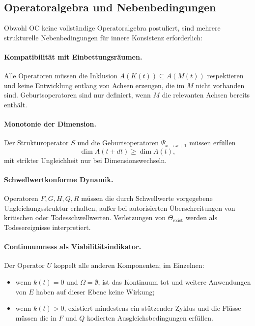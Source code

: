 \subsection{Operatoralgebra und Nebenbedingungen}

Obwohl OC keine vollständige Operatoralgebra postuliert, sind mehrere
strukturelle Nebenbedingungen für innere Konsistenz erforderlich:

\paragraph{Kompatibilität mit Einbettungsräumen.}
Alle Operatoren müssen die Inklusion
\(A(K(t)) \subseteq A(M(t))\) respektieren und keine Entwicklung entlang von
Achsen erzeugen, die im \(M\) nicht vorhanden sind. Geburtsoperatoren sind nur
definiert, wenn \(M\) die relevanten Achsen bereits enthält.

\paragraph{Monotonie der Dimension.}
Der Strukturoperator \(S\) und die Geburtsoperatoren \(\Psi_{x\to x+1}\) müssen
erfüllen
\[
  \dim A(t+dt) \ge \dim A(t),
\]
mit strikter Ungleichheit nur bei Dimensionswechseln.

\paragraph{Schwellwertkonforme Dynamik.}
Operatoren \(F, G, H, Q, R\) müssen die durch Schwellwerte vorgegebene
Ungleichungsstruktur erhalten, außer bei autorisierten Überschreitungen von
kritischen oder Todesschwellwerten. Verletzungen von
\(\Theta_{\mathrm{exist}}\) werden als Todesereignisse interpretiert.

\paragraph{Continuumness als Viabilitätsindikator.}
Der Operator \(U\) koppelt alle anderen Komponenten; im Einzelnen:
\begin{itemize}
  \item wenn \(k(t) = 0\) und \(\Omega = \emptyset\), ist das Kontinuum tot und
        weitere Anwendungen von \(E\) haben auf dieser Ebene keine Wirkung;
  \item wenn \(k(t) > 0\), existiert mindestens ein stützender Zyklus und die
        Flüsse müssen die in \(F\) und \(Q\) kodierten Ausgleichsbedingungen
        erfüllen.
\end{itemize}

